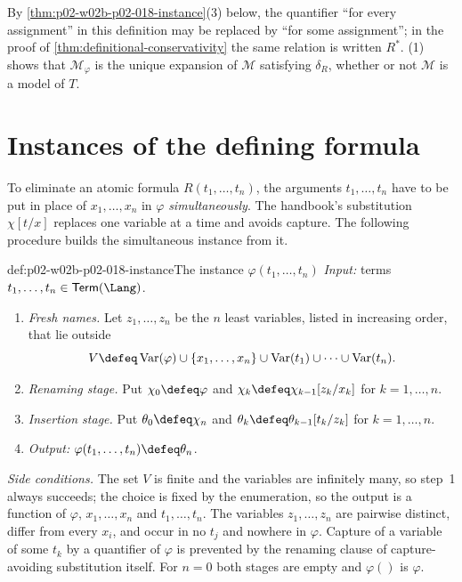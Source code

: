 By \cref{thm:p02-w02b-p02-018-instance}(3) below, the quantifier ``for
every assignment'' in this definition may be replaced by ``for some
assignment''; in the proof of \cref{thm:definitional-conservativity} the
same relation is written \(R^{*}\).
(1) shows that
\(\mathcal M_{\varphi}\) is the unique expansion of \(\mathcal M\)
satisfying \(\delta_R\), whether or not \(\mathcal M\) is a model of \(T\).

\section{Instances of the defining formula}
\label{sec:p02-w02b-p02-018-instances}

To eliminate an atomic formula \(R(t_1,\ldots,t_n)\), the arguments
\(t_1,\ldots,t_n\) have to be put in place of \(x_1,\ldots,x_n\) in
\(\varphi\) \emph{simultaneously}.  The handbook's substitution
\(\chi[t/x]\) replaces one variable at a time and avoids capture.  The
following procedure builds the simultaneous instance from it.

\begin{hbmethod}{def:p02-w02b-p02-018-instance}{The instance \(\varphi(t_1,\ldots,t_n)\)}
\emph{Input:} terms \(t_1,\ldots,t_n\in\mathsf{Term}(\Lang)\).
\begin{enumerate}
 \item \emph{Fresh names.}  Let \(z_1,\ldots,z_n\) be the \(n\) least
       variables, listed in increasing order, that lie outside
       \[
        V\defeq\operatorname{Var}(\varphi)\cup\{x_1,\ldots,x_n\}
        \cup\operatorname{Var}(t_1)\cup\cdots\cup\operatorname{Var}(t_n).
       \]
 \item \emph{Renaming stage.}  Put \(\chi_0\defeq\varphi\) and
       \(\chi_k\defeq\chi_{k-1}[z_k/x_k]\) for \(k=1,\ldots,n\).
 \item \emph{Insertion stage.}  Put \(\theta_0\defeq\chi_n\) and
       \(\theta_k\defeq\theta_{k-1}[t_k/z_k]\) for \(k=1,\ldots,n\).
 \item \emph{Output:} \(\varphi(t_1,\ldots,t_n)\defeq\theta_n\).
\end{enumerate}
\emph{Side conditions.}  The set \(V\) is finite and the variables are
infinitely many, so step~1 always succeeds; the choice is fixed by the
enumeration, so the output is a function of \(\varphi\), \(x_1,\ldots,x_n\)
and \(t_1,\ldots,t_n\).  The variables \(z_1,\ldots,z_n\) are pairwise
distinct, differ from every \(x_i\), and occur in no \(t_j\) and nowhere in
\(\varphi\).  Capture of a variable of some \(t_k\) by a quantifier of
\(\varphi\) is prevented by the renaming clause of capture-avoiding
substitution itself.  For \(n=0\) both stages are empty and
\(\varphi()\) is \(\varphi\).
\end{hbmethod}

